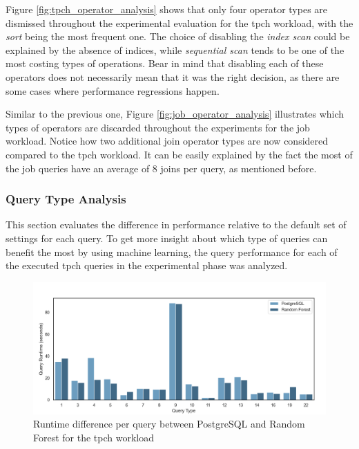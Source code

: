 Figure \ref{fig:tpch_operator_analysis} shows that only four operator types are dismissed throughout the experimental evaluation for the \gls{tpch} workload, with the \textit{sort} being the most frequent one. The choice of disabling the \textit{index scan} could be explained by the absence of indices, while \textit{sequential scan} tends to be one of the most costing types of operations. Bear in mind that disabling each of these operators does not necessarily mean that it was the right decision, as there are some cases where performance regressions happen.

Similar to the previous one, Figure \ref{fig:job_operator_analysis} illustrates which types of operators are discarded throughout the experiments for the \gls{job} workload. Notice how two additional join operator types are now considered compared to the \gls{tpch} workload. It can be easily explained by the fact the most of the \gls{job} queries have an average of 8 joins per query, as mentioned before.

\subsubsection{Query Type Analysis}

This section evaluates the difference in performance relative to the default set of settings for each query. To get more insight about which type of queries can benefit the most by using machine learning, the query performance for each of the executed \gls{tpch} queries in the experimental phase was analyzed.

\begin{figure}[H]
\centering
\includegraphics[width=\textwidth]{img/performance_evaluation/tpch_query_analysis.png}
\caption{Runtime difference per query between PostgreSQL and Random Forest for the \gls{tpch} workload}
\label{fig:tpch_query_analysis}
\end{figure}

